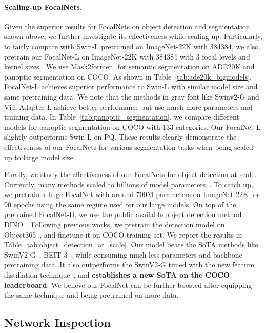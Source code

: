 \documentclass{article}
\begin{document}
\paragraph{Scaling-up FocalNets.} Given the superior results for FocalNets on object detection and segmentation shown above, we further investigate its effectiveness while scaling up. Particularly, to fairly compare with Swin-L pretrained on ImageNet-22K with 384384, we also pretrain our FocalNet-L on ImageNet-22K with 384384 with 3 focal levels and kernel sizes . We use Mask2former~\cite{cheng2021masked} for semantic segmentation on ADE20K and panoptic segmentation on COCO. As shown in Table~\ref{tab:ade20k_bigmodels}, FocalNet-L achieves superior performance to Swin-L with similar model size and same pretraining data. We note that the methods in gray font like Swinv2-G and ViT-Adapter-L achieve better performance but use much more parameters and training data. In Table~\ref{tab:panoptic_segmentation}, we compare different models for panoptic segmentation on COCO with 133 categories. {Our FocalNet-L slightly outperforms Swin-L on PQ}. These results clearly demonstrate the effectiveness of our FocalNets for various segmentation tasks when being scaled up to large model size.

Finally, we study the effectiveness of our FocalNets for object detection at scale. Currently, many methods scaled to billions of model parameters~\cite{liu2021swinv2, wang2022image}. To catch up, we pretrain a huge FocalNet with around 700M parameters on ImageNet-22K for 90 epochs using the same regime used for our large models. On top of the pretrained FocalNet-H, we use the public available object detection method DINO~\cite{zhang2022dino}. Following previous works, we pretrain the detection model on Object365~\cite{shao2019objects365}, and finetune it on COCO training set. We report the results in Table~\ref{tab:object_detection_at_scale}. Our model beats the SoTA methods like SwinV2-G~\cite{liu2021swinv2}, BEIT-3~\cite{zhang2022dino}, while consuming much less parameters and backbone pretraining data. 
It also outperforms the SwinV2-G tuned with the new feature distillation technique~\cite{wei2022contrastive}, and \textbf{establishes a new SoTA on the COCO leaderboard}. We believe our FocalNet can be further boosted after equipping the same technique and being pretrained on more data.

\subsection{Network Inspection}
\end{document}
